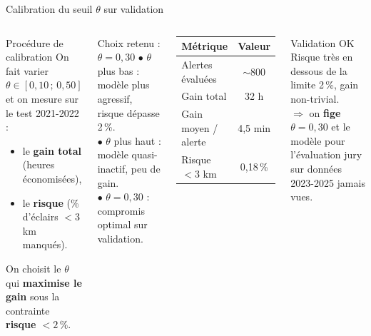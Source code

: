 \documentclass[aspectratio=169,t,11pt]{beamer}
\begin{document}
\begin{frame}{Calibration du seuil $\theta$ sur validation}
\vspace{-2pt}
\begin{columns}[T]

\begin{block}{Procédure de calibration}
\small
On fait varier $\theta \in [0{,}10\,;\,0{,}50]$ et on mesure sur le test 2021-2022 :
\begin{itemize}\setlength\itemsep{1pt}
  \item le \textbf{gain total} (heures économisées),
  \item le \textbf{risque} (\% d'éclairs $<3$ km manqués).
\end{itemize}
\vspace{3pt}
On choisit le $\theta$ qui \textbf{maximise le gain} sous la contrainte
\textbf{risque $< 2\,\%$}.
\end{block}
\vspace{3pt}
\begin{exampleblock}{Choix retenu : $\theta = 0{,}30$}
\footnotesize
$\bullet$ $\theta$ plus bas : modèle plus agressif, risque dépasse 2\,\%.\\
$\bullet$ $\theta$ plus haut : modèle quasi-inactif, peu de gain.\\
$\bullet$ $\theta = 0{,}30$ : compromis optimal sur validation.
\end{exampleblock}

\begin{tcolorbox}[mybox,colback=metMid!10,colframe=metMid,
  title={Résultats sur test 2021-2022 à $\theta=0{,}30$}]
\small
\centering
\begin{tabular}{lc}
\toprule
\textbf{Métrique} & \textbf{Valeur} \\
\midrule
Alertes évaluées        & $\sim$800 \\
Gain total              & 32 h \\
Gain moyen / alerte     & 4,5 min \\
Risque $<3$ km          & 0,18\,\% \\
\bottomrule
\end{tabular}
\end{tcolorbox}
\vspace{4pt}
\begin{alertblock}{Validation OK}
\footnotesize
Risque très en dessous de la limite 2\,\%, gain non-trivial.\\
$\Rightarrow$ on \textbf{fige} $\theta = 0{,}30$ et le modèle pour
l'évaluation jury sur données 2023-2025 jamais vues.
\end{alertblock}
\end{columns}
\end{frame}
\end{document}
